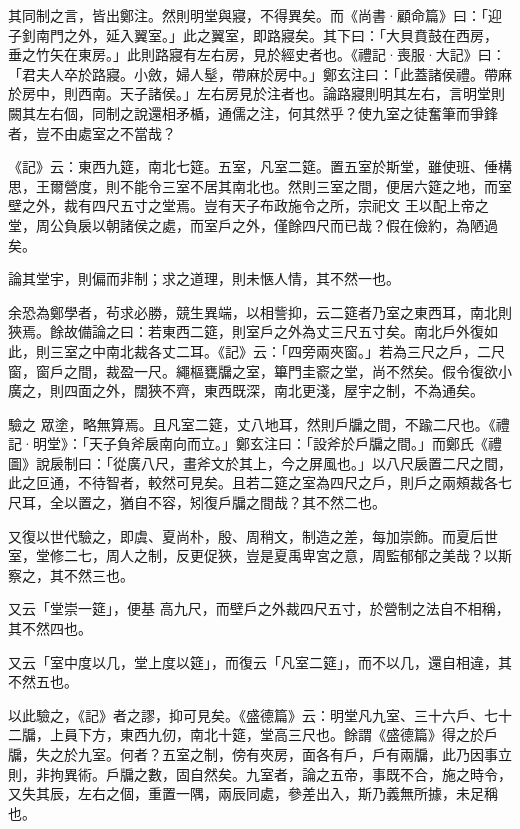 \begin{pinyinscope}
 其同制之言，皆出鄭注。然則明堂與寢，不得異矣。而《尚書·顧命篇》曰：「迎子釗南門之外，延入翼室。」此之翼室，即路寢矣。其下曰：「大貝賁鼓在西房，
 垂之竹矢在東房。」此則路寢有左右房，見於經史者也。《禮記·喪服·大記》曰：「君夫人卒於路寢。小斂，婦人髽，帶麻於房中。」鄭玄注曰：「此蓋諸侯禮。帶麻於房中，則西南。天子諸侯。」左右房見於注者也。論路寢則明其左右，言明堂則闕其左右個，同制之說還相矛楯，通儒之注，何其然乎？使九室之徒奮筆而爭鋒者，豈不由處室之不當哉？



 《記》云：東西九筵，南北七筵。五室，凡室二筵。置五室於斯堂，雖使班、倕構思，王爾營度，則不能令三室不居其南北也。然則三室之間，便居六筵之地，而室壁之外，裁有四尺五寸之堂焉。豈有天子布政施令之所，宗祀文
 王以配上帝之堂，周公負扆以朝諸侯之處，而室戶之外，僅餘四尺而已哉？假在儉約，為陋過矣。



 論其堂宇，則偏而非制；求之道理，則未愜人情，其不然一也。



 余恐為鄭學者，茍求必勝，競生異端，以相訾抑，云二筵者乃室之東西耳，南北則狹焉。餘故備論之曰：若東西二筵，則室戶之外為丈三尺五寸矣。南北戶外復如此，則三室之中南北裁各丈二耳。《記》云：「四旁兩夾窗。」若為三尺之戶，二尺窗，窗戶之間，裁盈一尺。繩樞甕牖之室，篳門圭窬之堂，尚不然矣。假令復欲小廣之，則四面之外，闊狹不齊，東西既深，南北更淺，屋宇之制，不為通矣。



 驗之
 眾塗，略無算焉。且凡室二筵，丈八地耳，然則戶牖之間，不踰二尺也。《禮記·明堂》：「天子負斧扆南向而立。」鄭玄注曰：「設斧於戶牖之間。」而鄭氏《禮圖》說扆制曰：「從廣八尺，畫斧文於其上，今之屏風也。」以八尺扆置二尺之間，此之叵通，不待智者，較然可見矣。且若二筵之室為四尺之戶，則戶之兩頰裁各七尺耳，全以置之，猶自不容，矧復戶牖之間哉？其不然二也。



 又復以世代驗之，即虞、夏尚朴，殷、周稍文，制造之差，每加崇飾。而夏后世室，堂修二七，周人之制，反更促狹，豈是夏禹卑宮之意，周監郁郁之美哉？以斯察之，其不然三也。



 又云「堂崇一筵」，便基
 高九尺，而壁戶之外裁四尺五寸，於營制之法自不相稱，其不然四也。



 又云「室中度以几，堂上度以筵」，而復云「凡室二筵」，而不以几，還自相違，其不然五也。



 以此驗之，《記》者之謬，抑可見矣。《盛德篇》云：明堂凡九室、三十六戶、七十二牖，上員下方，東西九仞，南北十筵，堂高三尺也。餘謂《盛德篇》得之於戶牖，失之於九室。何者？五室之制，傍有夾房，面各有戶，戶有兩牖，此乃因事立則，非拘異術。戶牖之數，固自然矣。九室者，論之五帝，事既不合，施之時令，又失其辰，左右之個，重置一隅，兩辰同處，參差出入，斯乃義無所據，未足稱也。




\end{pinyinscope}

